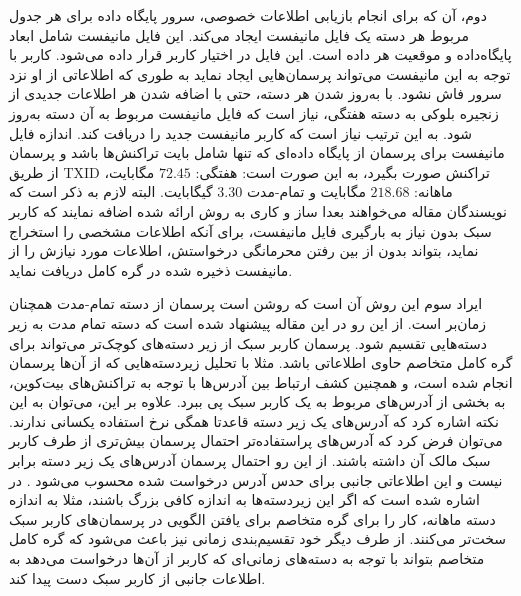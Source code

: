 دوم، آن که برای انجام بازیابی اطلاعات خصوصی، سرور پایگاه داده برای هر جدول مربوط هر دسته یک فایل مانیفست ایجاد می‌کند. این فایل مانیفست شامل ابعاد پایگاه‌داده و موقعیت هر داده است. این فایل در اختیار کاربر قرار داده می‌شود. کاربر با توجه به این مانیفست می‌تواند پرسمان‌هایی ایجاد نماید به طوری که اطلاعاتی از او نزد سرور فاش نشود. با به‌روز شدن هر دسته، حتی با اضافه شدن هر اطلاعات جدیدی از زنجیره بلوکی به دسته هفتگی، نیاز است که فایل مانیفست مربوط به آن دسته به‌روز شود. به این ترتیب نیاز است که کاربر مانیفست جدید را دریافت کند. اندازه فایل مانیفست برای پرسمان از پایگاه داده‌ای که تنها شامل بایت‌ تراکنش‌ها باشد و پرسمان از طریق TXID تراکنش صورت بگیرد، به این صورت است: هفتگی: $72.45$ مگابایت، ماهانه: $218.68$ مگابایت و تمام-مدت $3.30$ گیگابایت. البته لازم به ذکر است که نویسندگان مقاله \cite{Qin2019} می‌خواهند بعدا ساز و کاری به روش ارائه شده اضافه نمایند که کاربر سبک بدون نیاز به بارگیری فایل مانیفست، برای آنکه اطلاعات مشخصی را استخراج نماید، بتواند بدون از بین رفتن محرمانگی درخواستش، اطلاعات مورد نیازش را از مانیفست ذخیره شده در گره کامل دریافت نماید.

ایراد سوم این روش آن است که روشن است پرسمان از دسته تمام-مدت همچنان زمان‌بر است. از این رو در این مقاله پیشنهاد شده است که دسته تمام مدت به زیر دسته‌‌هایی تقسیم شود.  پرسمان کاربر سبک از زیر دسته‌های کوچک‌تر می‌تواند برای گره کامل متخاصم حاوی اطلاعاتی باشد. مثلا با تحلیل زیردسته‌هایی که از آن‌ها پرسمان انجام شده است، و همچنین کشف ارتباط بین آدرس‌ها با توجه به تراکنش‌های بیت‌کوین، به بخشی از آدرس‌های مربوط به یک کاربر سبک پی ببرد. علاوه بر این، می‌توان به این نکته اشاره کرد که آدرس‌های یک زیر دسته قاعدتا همگی نرخ استفاده یکسانی ندارند. می‌توان فرض کرد که آدرس‌های پراستفاده‌تر احتمال پرسمان بیش‌تری از طرف کاربر سبک مالک آن داشته باشند. از این رو احتمال پرسمان آدرس‌های یک زیر دسته برابر نیست و این اطلاعاتی جانبی برای حدس آدرس درخواست شده محسوب می‌شود \cite{Niu2015}. در \cite{Qin2019} اشاره شده است که اگر این زیردسته‌ها به اندازه کافی بزرگ باشند، مثلا به اندازه دسته ماهانه، کار را برای گره متخاصم برای یافتن الگویی در پرسمان‌های کاربر سبک سخت‌تر می‌کنند. از طرف دیگر خود تقسیم‌بندی زمانی نیز باعث می‌شود که گره کامل متخاصم بتواند با توجه به دسته‌های زمانی‌ای که کاربر از آن‌ها درخواست می‌دهد به اطلاعات جانبی از کاربر سبک دست پیدا کند. 


